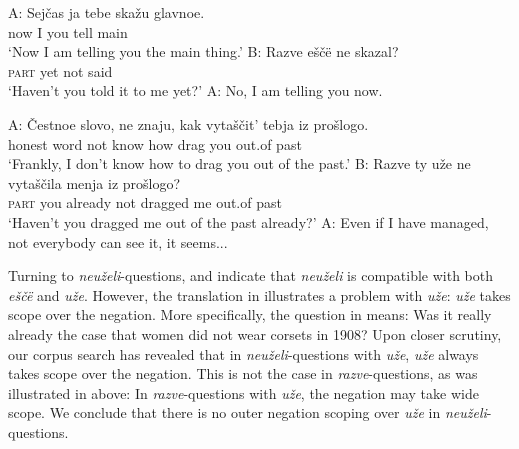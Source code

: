 \documentclass[output=paper,colorlinks,citecolor=brown]{langscibook}
\begin{document}
\ea \label{ex:05:6}
A: \gll Sejčas ja tebe skažu glavnoe. \\ 
now I you tell main\\
\glt \phantom{A:} `Now I am telling you the main thing.'
\sn 
B: \gll Razve eščë ne skazal? \\
{\textsc{part}} yet not said\\
\glt \phantom{b:} `Haven't you told it to me yet?' 
\sn A: No, I am telling you now. \\
\begin{flushright}
\end{flushright}
\ex \label{ex:05:7}
A: \gll Čestnoe slovo, ne znaju, kak vytaščit' tebja iz prošlogo. \\
 honest word not know how drag you out.of past \\
\glt \phantom{A:} `Frankly, I don't know how to drag you out of the past.'
\sn 
B: \gll Razve ty uže ne vytaščila menja iz prošlogo? \\
\textsc{part} you already not dragged me out.of past\\
\glt \phantom{B:} `Haven't you dragged me out of the past already?'
\sn A: Even if I have managed, not everybody can see it, it seems...
\begin{flushright}
\end{flushright}
\z

Turning to \textit{neuželi}-questions,  and  indicate that \textit{neuželi} is compatible with both \textit{eščë} and \textit{uže}. However, the translation in  illustrates a problem with \textit{uže}: \textit{uže} takes scope over the negation. More specifically, the question in  means: Was it really already the case that women did not wear corsets in 1908? Upon closer scrutiny, our corpus search has revealed that in \textit{neuželi}-questions with \textit{uže}, \textit{uže} always takes scope over the negation. This is not the case in \textit{razve}-questions, as was illustrated in  above: In \textit{razve}-questions with \textit{uže}, the negation may take wide scope. We conclude that there is no outer negation scoping over \textit{uže} in \textit{neuželi}-questions.
\end{document}
